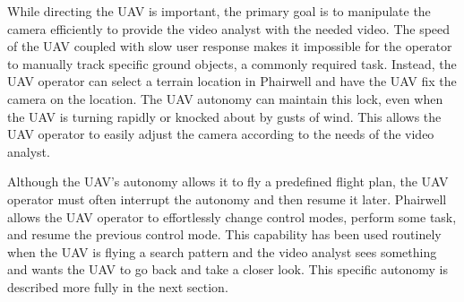 While directing the UAV is important, the primary goal is to manipulate the camera efficiently to provide the video analyst with the needed video. The speed of the UAV coupled with slow user response makes it impossible for the operator to manually track specific ground objects, a commonly required task. Instead, the UAV operator can select a terrain location in Phairwell and have the UAV fix the camera on the location. The UAV autonomy can maintain this lock, even when the UAV is turning rapidly or knocked about by gusts of wind. This allows the UAV operator to easily adjust the camera according to the needs of the video analyst.



Although the UAV's autonomy allows it to fly a predefined flight plan, the UAV operator must often interrupt the autonomy and then resume it later. Phairwell allows the UAV operator to effortlessly change control modes, perform some task, and resume the previous control mode. This capability has been used routinely when the UAV is flying a search pattern and the video analyst sees something and wants the UAV to go back and take a closer look. This specific autonomy is described more fully in the next section.


